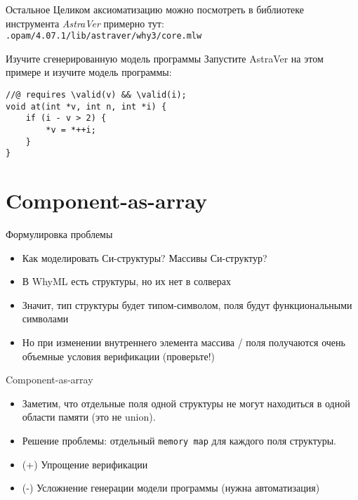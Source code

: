 \documentclass[hyperref={unicode=true}]{beamer}
\begin{document}
    \begin{frame}{Остальное}
    Целиком аксиоматизацию можно посмотреть в
    библиотеке инструмента \textsl{AstraVer} примерно тут:
    \texttt{.opam/4.07.1/lib/astraver/why3/core.mlw}
    \end{frame}

    \begin{frame}[fragile]{Изучите сгенерированную модель программы}
    Запустите AstraVer на этом примере
    и изучите модель программы:
    \begin{lstlisting}
//@ requires \valid(v) && \valid(i);
void at(int *v, int n, int *i) {
    if (i - v > 2) {
        *v = *++i;
    }
}    \end{lstlisting}
    \end{frame}

    \section{Component-as-array}

    \begin{frame}{Формулировка проблемы}
    \begin{itemize}
    \item Как моделировать Си-структуры? Массивы Си-структур?
    \item В WhyML есть структуры, но их нет в солверах
    \item Значит, тип структуры будет типом-символом, поля будут
    функциональными символами
    \item Но при изменении внутреннего элемента массива / поля
    получаются очень объемные условия верификации (проверьте!)
    \end{itemize}
    \end{frame}

    \begin{frame}{Component-as-array}
    \begin{itemize}
    \item Заметим, что отдельные поля одной структуры не могут
    находиться в одной области памяти (это не union).
    \item Решение проблемы: отдельный \texttt{memory map} для
    каждого поля структуры.
    \item (+) Упрощение верификации
    \item (-) Усложнение генерации модели программы (нужна
            автоматизация)
    \end{itemize}
    \end{frame}
\end{document}
